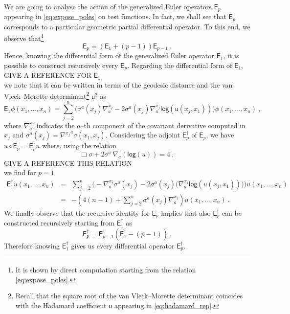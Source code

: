 \documentclass[11pt]{book}
\newcommand{\hilight}[1]{\colorbox{yellow!80!black}{#1}}
\renewcommand{\log}{\mathsf{log}}
\newcommand{\Esf}{\mathsf{E}}
\newcommand{\usf}{\mathsf{u}}
\theoremstyle{break}
\begin{document}
We are going to analyse the action of the generalized Euler operators $\Esf_p$ appearing in \eqref{eq:expose_poles} on test functions. In fact, we shall see that $\Esf_p$ corresponds to a particular geometric partial differential operator. To this end, we observe that\footnote{It is shown by direct computation starting from the relation \eqref{eq:expose_poles}.}
%
\begin{equation*}
\Esf_p = (\Esf_1 + (p-1)) \Esf_{p-1} \ . 
\end{equation*}
%
Hence, knowing the differential form of the generalized Euler operator $\Esf_1$, it is possible to construct recursively every $\Esf_p$. Regarding the differential form of $\Esf_1$,\\
\hilight{GIVE A REFERENCE FOR $\Esf_1$}\\
we note that it can be written in terms of the geodesic distance and the van Vleck--Morette determinant\footnote{Recall that the square root of the van Vleck--Morette determinant coincides with the Hadamard coefficient $\usf$ appearing in \eqref{eq:hadamard_rep}.} $\usf^2$  as
%
\begin{equation*}
\Esf_1 \phi(x_1 , \dots , x_n) = \sum_{j=2}^n \bigg( \sigma^a(x_j) \nabla^{x_j}_a  - 2  \sigma^a(x_j) \nabla^{x_j}_a  \log\left(\usf(x_j,x_1)\right) \bigg) \phi(x_1 , \dots , x_n) \ , 
\end{equation*}
%
where $\nabla^{x_j}_a$ indicates the $a$--th component of the covariant derivative computed in $x_j$ and $\sigma^a(x_j) = {\nabla^{x_j}}^a \sigma(x_1,x_j)$. Considering the adjoint $\Esf^\dagger_p$ of $\Esf_p$, we have $u \circ \Esf_p = \Esf^\dagger_p u$ where, using the relation
\begin{equation*}
\Box \sigma + 2 \sigma^a \ \nabla_a\left( \log (u) \right) = 4 \ , 
\end{equation*}
%
\hilight{GIVE A REFERENCE THIS RELATION} \\
we find for $p=1$
%
\begin{eqnarray}
\Esf_1^\dagger  u(x_1,\dots,x_n) &=& \sum_{j=2}^n \Bigg( - \nabla^{x_j}_a \sigma^a(x_j) - 2 \sigma^a(x_j) \bigg( \nabla^{x_j}_a \log\left(u(x_j,x_1)\right) \bigg) \Bigg) u(x_1,\dots,x_n) \nonumber \\
&=& -\left( 4(n-1) + \sum_{j=2}^n \sigma^a(x_j) \nabla^{x_j}_a \right) u(x_1,\dots,x_n) \ .
\label{eq:euler_operator}
\end{eqnarray}
%
We finally observe that the recursive identity for $\Esf_p$ implies that also $\Esf^\dagger_p$ can be constructed recursively starting from $\Esf^\dagger_1$ as 
%
\begin{equation*}
\Esf_p^\dagger = \Esf_{p-1}^\dagger \left(\Esf_1^\dagger-(p-1)\right) \ . 
\end{equation*}
%
Therefore knowing $\Esf_1^\dagger$ gives us every differential operator $\Esf_p^\dagger$.
\end{document}
